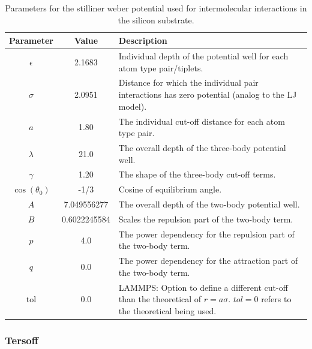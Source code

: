 \begin{table}[H]
  \begin{center}
  \caption{Parameters for the stilliner weber potential used for intermolecular interactions in the silicon substrate.}
  \label{tab:sw_param}
  \begin{tabular}{ | c | c | L{9cm} |} \hline
    Parameter & Value & Description \\ \hline 
    $\epsilon$ & 2.1683  & Individual depth of the potential well for each atom
    type pair/tiplets. \\ \hline
    $\sigma$ & 2.0951 & Distance for which the individual pair interactions has
    zero potential (analog to the LJ model). \\ \hline
    $a$ & 1.80 & The individual cut-off distance for each atom type pair. \\
    \hline
    $\lambda$ & 21.0 & The overall depth of the three-body potential well. \\
    \hline
    $\gamma$ & 1.20 & The shape of the three-body cut-off terms. \\ \hline
    $\cos{(\theta_0)}$ & -1/3 & Cosine of equilibrium angle. \\ \hline
    $A$ &  7.049556277 & The overall depth of the two-body potential well. \\
    \hline
    $B$ &  0.6022245584 & Scales the repulsion part of the two-body term. \\
    \hline
    $p$  & 4.0 & The power dependency for the repulsion part of the two-body
    term. \\ \hline
    $q$  & 0.0 & The power dependency for the attraction part of the two-body
    term. \\ \hline
    tol  & 0.0 & LAMMPS: Option to define a different cut-off than the
    theoretical of $r = a\sigma$. $tol = 0$ refers to the theoretical being
    used. \\ \hline
  \end{tabular}
  \end{center}
\end{table}



\subsubsection{Tersoff}


